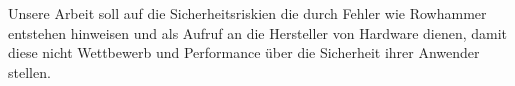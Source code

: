 \begin{otherlanguage}{ngerman}
Unsere Arbeit soll auf die Sicherheitsriskien die durch Fehler wie Rowhammer
entstehen hinweisen und als Aufruf an die Hersteller von Hardware dienen, damit
diese nicht Wettbewerb und Performance über die Sicherheit ihrer Anwender
stellen.

\end{otherlanguage}

